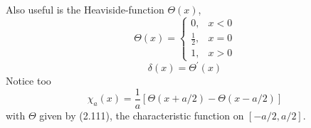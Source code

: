 Also useful is the Heaviside-function $\Theta(x)$,
\begin{equation}
\Theta(x)=\left\{\begin{array}{ll}{0,} & {x<0} \\ {\frac{1}{2},} & {x=0} \\ {1,} & {x>0}\end{array}\right.
\end{equation}
\begin{equation}
    \delta(x)=\Theta^{\prime}(x)
    \end{equation}
Notice too
\begin{equation}
    \chi_{a}(x)=\frac{1}{a}[\Theta(x+a / 2)-\Theta(x-a / 2)]
    \end{equation}
with $\Theta$ given by (2.111), the characteristic function on $[-a / 2, a / 2]$.